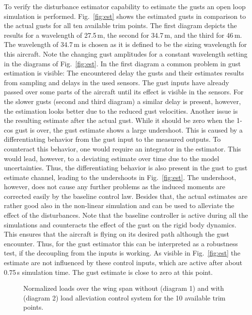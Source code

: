\documentclass[graybox]{svmult}
\begin{document}
To verify the disturbance estimator capability to estimate the gusts an open loop simulation is performed. Fig.~\ref{fig:est} shows the estimated gusts in comparison to the actual gusts for all ten available trim points. The first diagram depicts the results for a wavelength of  27.5\,m, the second for 34.7\,m, and the third for 46\,m. The wavelength of 34.7\,m is chosen as it is defined to be the sizing wavelength for this aircraft. Note the changing gust amplitudes for a constant wavelength setting in the diagrams of Fig.~\ref{fig:est}. In the first diagram a common problem in gust estimation is visible: The encountered delay the gusts and their estimates results from sampling and delays in the used sensors. The gust inputs have already passed over some parts of the aircraft until its effect is visible in the sensors.
For the slower gusts (second and third diagram) a similar delay is present, however, the estimation looks better due to the reduced gust velocities. Another issue is the resulting estimate after the actual gust. While it should be zero when the 1-cos gust is over, the gust estimate shows a large undershoot. 
This is caused by a differentiating behavior from the gust input to the measured outputs. To counteract this behavior, one would require an integrator in the estimator. This would lead, however, to a deviating estimate over time due to the model uncertainties.  Thus, the differentiating behavior is also present in the gust to gust estimate channel, leading to the undershoots in Fig.~\ref{fig:est}. The undershoot, however, does not cause any further problems as the induced moments are corrected easily by the baseline control law.
Besides that, the actual estimates are rather good also in the non-linear simulation and can be used to alleviate the effect of the disturbances.
Note that the baseline controller is active during all the simulations and counteracts the effect of the gust on the rigid body dynamics. This ensures that the aircraft is flying on its desired path although the gust encounter. Thus, for the gust estimator this can be interpreted as a robustness test, if the decoupling from the inputs is working. As visible in Fig.~\ref{fig:est} the estimate are not influenced by these control inputs, which are active after about 0.75\,s simulation time. The gust estimate is close to zero at this point. 



\begin{figure}[!b]
	\sidecaption[]
	
	\caption{Normalized loads over the wing span without (diagram 1) and with (diagram 2) load alleviation control system  for the 10 available trim points.}
	\label{fig:loads}	
\end{figure}
\end{document}
